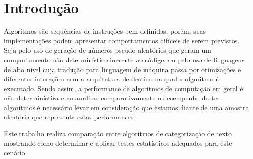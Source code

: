 \documentclass[conference]{IEEEtran}
\begin{document}

\section{Introdução}
\label{sec:intro}

Algoritmos são sequências de instruções bem definidas, porém, suas implementações podem apresentar comportamentos difíceis de serem previstos.
Seja pelo uso de geração de números pseudo-aleatórios que geram um comportamento não determinístico inerente ao código, ou pelo uso de linguagens de alto nível cuja tradução para linguagem de máquina passa por otimizações e diferentes interações com a arquitetura de destino na qual o algoritmo é executado.
Sendo assim, a performance de algoritmos de computação em geral é não-determinística e ao analisar comparativamente o desempenho destes algoritmos é necessário levar em consideração que estamos diante de uma amostra aleatória que representa estas performances.

Este trabalho realiza comparação entre algoritmos de categorização de texto mostrando como determinar e aplicar testes estatísticos adequados para este cenário.
\end{document}
